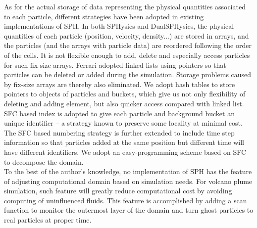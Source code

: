 \documentclass[procedia]{easychair}
\begin{document}
As for the actual storage of data representing the physical quantities associated to each particle, different strategies have been adopted in existing implementations of SPH. 
In both SPHysics and DualSPHysics\cite{crespo2015dualsphysics}, the physical quantities of each particle (position, velocity, density...) are stored in arrays, and the particles (and the arrays with particle data) are reordered following the order of the cells. It is not flexible enough to add, delete and especially access particles for such fix-size arrays. Ferrari\cite{ferrari2009new} adopted linked lists using pointers so that particles can be deleted or added during the simulation. Storage problems caused by fix-size arrays are thereby also eliminated. We adopt hash tables to store pointers to objects of particles and buckets, which give us not only flexibility of deleting and adding element, but also quicker access compared with linked list. SFC based index is adopted to give each particle and background bucket an unique identifier -- a strategy known to preserve some locality at minimal cost. The SFC based numbering strategy is further extended to include time step information so that particles added at the same position but different time will have different identifiers. 
We adopt an easy-programming scheme based on SFC \cite{patra1999efficient} to decompose the domain.\\
To the best of the author's knowledge, no implementation of SPH has the feature of adjusting computational domain based on simulation needs. For volcano plume simulation, such feature will greatly reduce computational cost by avoiding computing of uninfluenced fluids. This feature is accomplished by adding a scan function to monitor the outermost layer of the domain and turn ghost particles to real particles at proper time.\\
\end{document}
